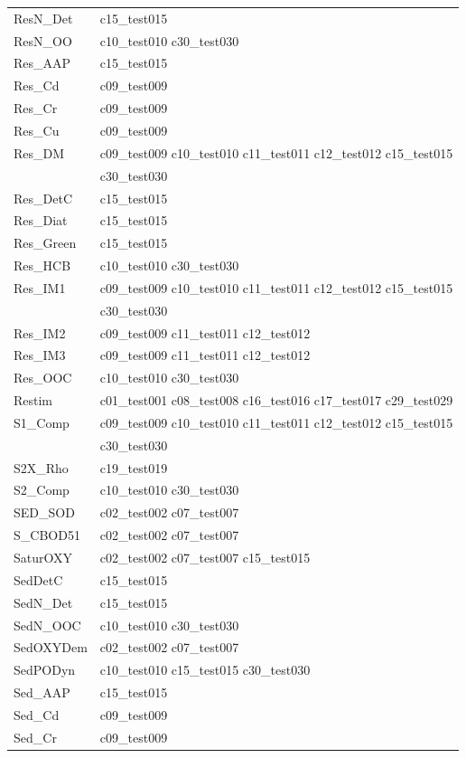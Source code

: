 \begin{longtable}{ll}
ResN\_Det & c15\_test015 \\
ResN\_OO & c10\_test010 c30\_test030 \\
Res\_AAP & c15\_test015 \\
Res\_Cd & c09\_test009 \\
Res\_Cr & c09\_test009 \\
Res\_Cu & c09\_test009 \\
Res\_DM & c09\_test009 c10\_test010 c11\_test011 c12\_test012 c15\_test015 \\ 
 & c30\_test030 \\
Res\_DetC & c15\_test015 \\
Res\_Diat & c15\_test015 \\
Res\_Green & c15\_test015 \\
Res\_HCB & c10\_test010 c30\_test030 \\
Res\_IM1 & c09\_test009 c10\_test010 c11\_test011 c12\_test012 c15\_test015 \\ 
 & c30\_test030 \\
Res\_IM2 & c09\_test009 c11\_test011 c12\_test012 \\
Res\_IM3 & c09\_test009 c11\_test011 c12\_test012 \\
Res\_OOC & c10\_test010 c30\_test030 \\
Restim & c01\_test001 c08\_test008 c16\_test016 c17\_test017 c29\_test029 \\
S1\_Comp & c09\_test009 c10\_test010 c11\_test011 c12\_test012 c15\_test015 \\ 
 & c30\_test030 \\
S2X\_Rho & c19\_test019 \\
S2\_Comp & c10\_test010 c30\_test030 \\
SED\_SOD & c02\_test002 c07\_test007 \\
S\_CBOD51 & c02\_test002 c07\_test007 \\
SaturOXY & c02\_test002 c07\_test007 c15\_test015 \\
SedDetC & c15\_test015 \\
SedN\_Det & c15\_test015 \\
SedN\_OOC & c10\_test010 c30\_test030 \\
SedOXYDem & c02\_test002 c07\_test007 \\
SedPODyn & c10\_test010 c15\_test015 c30\_test030 \\
Sed\_AAP & c15\_test015 \\
Sed\_Cd & c09\_test009 \\
Sed\_Cr & c09\_test009 \\

\end{longtable}
